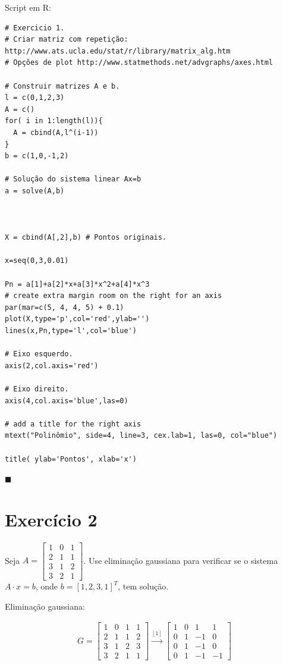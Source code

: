 \documentclass[12pt,a4paper]{article}
\newcommand{\qed}{\hfill $\blacksquare$}
\begin{document}
Script em R:
\begin{verbatim}
# Exercicio 1.
# Criar matriz com repetição: http://www.ats.ucla.edu/stat/r/library/matrix_alg.htm
# Opções de plot http://www.statmethods.net/advgraphs/axes.html

# Construir matrizes A e b.
l = c(0,1,2,3)
A = c()
for( i in 1:length(l)){  
  A = cbind(A,l^(i-1))
}
b = c(1,0,-1,2)

# Solução do sistema linear Ax=b
a = solve(A,b) 



X = cbind(A[,2],b) # Pontos originais.

x=seq(0,3,0.01)

Pn = a[1]+a[2]*x+a[3]*x^2+a[4]*x^3
# create extra margin room on the right for an axis 
par(mar=c(5, 4, 4, 5) + 0.1)
plot(X,type='p',col='red',ylab='')
lines(x,Pn,type='l',col='blue')

# Eixo esquerdo.
axis(2,col.axis='red')

# Eixo direito.
axis(4,col.axis='blue',las=0)

# add a title for the right axis 
mtext("Polinômio", side=4, line=3, cex.lab=1, las=0, col="blue")

title( ylab='Pontos', xlab='x')
\end{verbatim}
\qed


\newpage
\section*{Exercício 2}
Seja $A = \begin{bmatrix}
1 & 0 & 1 \\ 
2 & 1 & 1 \\ 
3 & 1 & 2 \\ 
3 & 2 & 1
\end{bmatrix} $. Use eliminação gaussiana para verificar se o sistema $ A \cdot x = b $, onde $ b =[1,2,3,1]^T $, tem solução.

Eliminação gaussiana:

\begin{align*}G=
\begin{bmatrix}
1 & 0 & 1 & 1\\ 
2 & 1 & 1 & 2\\ 
3 & 1 & 2 & 3\\ 
3 & 2 & 1 &1
\end{bmatrix}
\xrightarrow[]{[1]}
\begin{bmatrix}
1 & 0 & 1 & 1\\ 
0 & 1 & -1 & 0\\ 
0 & 1 & -1 & 0\\ 
0 & 1 & -1 &-1
\end{bmatrix}
\end{align*}
\end{document}
